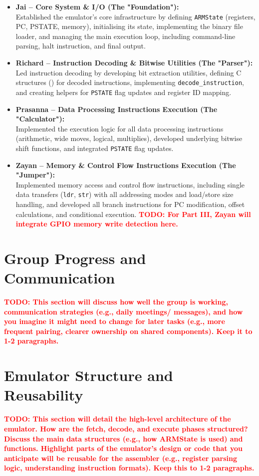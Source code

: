 \documentclass[11pt,a4paper]{article} %
\newcommand{\todo}[1]{\textcolor{red}{\textbf{TODO: #1}}}
\begin{document}
\begin{itemize}[leftmargin=1.5em,noitemsep, itemsep=0.5em, parsep=0em]
    \item \textbf{Jai -- Core System \& I/O (The "Foundation"):}\\
    Established the emulator's core infrastructure by defining \texttt{ARMState} (registers, PC, PSTATE, memory), initialising its state, implementing the binary file loader, and managing the main execution loop, including command-line parsing, halt instruction, and final output.
    \item \textbf{Richard -- Instruction Decoding \& Bitwise Utilities (The "Parser"):}\\
    Led instruction decoding by developing bit extraction utilities, defining C structures (\texttt{}) for decoded instructions, implementing \texttt{decode\_instruction}, and creating helpers for \texttt{PSTATE} flag updates and register ID mapping.
    \item \textbf{Prasanna -- Data Processing Instructions Execution (The "Calculator"):}\\
    Implemented the execution logic for all data processing instructions (arithmetic, wide moves, logical, multiplies), developed underlying bitwise shift functions, and integrated \texttt{PSTATE} flag updates.
    \item \textbf{Zayan -- Memory \& Control Flow Instructions Execution (The "Jumper"):}\\
    Implemented memory access and control flow instructions, including single data transfers (\texttt{ldr}, \texttt{str}) with all addressing modes and load/store size handling, and developed all branch instructions for PC modification, offset calculations, and conditional execution. \todo{For Part III, Zayan will integrate GPIO memory write detection here.}
\end{itemize}

\section{Group Progress and Communication}
\label{sec:group-progress}
\todo{This section will discuss how well the group is working, communication strategies (e.g., daily meetings/ messages), and how you imagine it might need to change for later tasks (e.g., more frequent pairing, clearer ownership on shared components). Keep it to 1-2 paragraphs.}

\section{Emulator Structure and Reusability}
\label{sec:emulator-structure}
\todo{This section will detail the high-level architecture of the emulator. How are the fetch, decode, and execute phases structured? Discuss the main data structures (e.g., how ARMState is used) and functions. Highlight parts of the emulator's design or code that you anticipate will be reusable for the assembler (e.g., register parsing logic, understanding instruction formats). Keep this to 1-2 paragraphs.}
\end{document}
